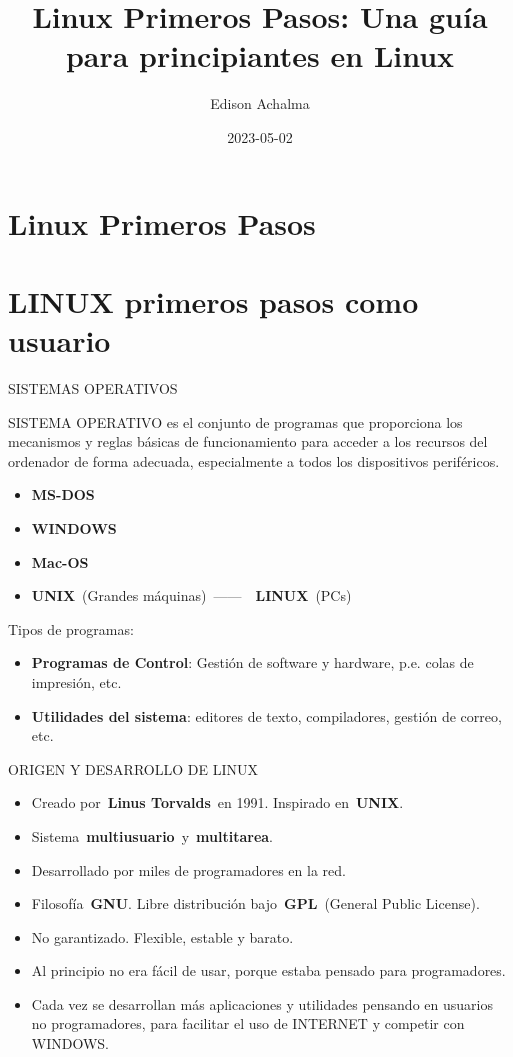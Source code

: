 \documentclass[
  jou,
  floatsintext,
  longtable,
  a4paper,
  nolmodern,
  notxfonts,
  notimes,
  colorlinks=true,linkcolor=blue,citecolor=blue,urlcolor=blue]{apa7}
\title{Linux Primeros Pasos: Una guía para principiantes en Linux}
\author{Edison Achalma}
\affiliation{
{Escuela Profesional de Economía, Universidad Nacional de San Cristóbal
de Huamanga}}
\date{2023-05-02}
\providecommand{\tightlist}{%
  \setlength{\itemsep}{0pt}\setlength{\parskip}{0pt}}
\begin{document}
\maketitle

\hypertarget{toc}{}
\tableofcontents
\newpage
\section[Introduction]{Linux Primeros Pasos}

\setcounter{secnumdepth}{-\maxdimen} %

\setlength\LTleft{0pt}


\section{LINUX primeros pasos como
usuario}\label{linux-primeros-pasos-como-usuario}

SISTEMAS OPERATIVOS

SISTEMA OPERATIVO es el conjunto de programas que proporciona los
mecanismos y reglas básicas de funcionamiento para acceder a los
recursos del ordenador de forma adecuada, especialmente a todos los
dispositivos periféricos.

\begin{itemize}
\tightlist
\item
  \textbf{MS-DOS}
\item
  \textbf{WINDOWS}
\item
  \textbf{Mac-OS}
\item
  \textbf{UNIX}~(Grandes máquinas)~------~~\textbf{LINUX}~(PCs)
\end{itemize}

Tipos de programas:

\begin{itemize}
\tightlist
\item
  \textbf{Programas de Control}: Gestión de software y hardware, p.e.
  colas de impresión, etc.
\item
  \textbf{Utilidades del sistema}: editores de texto, compiladores,
  gestión de correo, etc.
\end{itemize}

ORIGEN Y DESARROLLO DE LINUX

\begin{itemize}
\tightlist
\item
  Creado por~\textbf{Linus Torvalds}~en 1991. Inspirado
  en~\textbf{UNIX}.
\item
  Sistema~\textbf{multiusuario}~y~\textbf{multitarea}.
\item
  Desarrollado por miles de programadores en la red.
\item
  Filosofía~\textbf{GNU}. Libre distribución bajo~\textbf{GPL}~(General
  Public License).
\item
  No garantizado. Flexible, estable y barato.
\item
  Al principio no era fácil de usar, porque estaba pensado para
  programadores.
\item
  Cada vez se desarrollan más aplicaciones y utilidades pensando en
  usuarios no programadores, para facilitar el uso de INTERNET y
  competir con WINDOWS.
\end{itemize}
\end{document}
